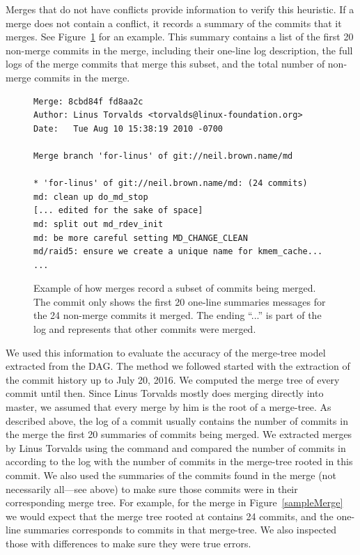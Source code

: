 \documentclass[conference, draftclsnofoot, draft]{IEEEtran}
\begin{document}
Merges that do not have conflicts provide information to verify this heuristic. If a
merge does not contain a conflict, it records a summary of the commits that it
merges. See Figure~\ref{fig:sampleMerge} for an example. This summary contains a
list of the first 20 non-merge commits in the merge, including their one-line log
description, the full logs of the merge commits that merge this subset, and the
total number of non-merge commits in the merge.

\begin{figure}[htbp]
        \centering
        {\fontsize{7}{9}
        \begin{verbatim}
Merge: 8cbd84f fd8aa2c
Author: Linus Torvalds <torvalds@linux-foundation.org>
Date:   Tue Aug 10 15:38:19 2010 -0700

Merge branch 'for-linus' of git://neil.brown.name/md

* 'for-linus' of git://neil.brown.name/md: (24 commits)
md: clean up do_md_stop
[... edited for the sake of space]
md: split out md_rdev_init
md: be more careful setting MD_CHANGE_CLEAN
md/raid5: ensure we create a unique name for kmem_cache...
...
        \end{verbatim}}\vspace{-5mm}
        \caption{Example of how merges record a subset of commits being merged. The
                commit only shows the first 20 one-line summaries messages for the 24
                non-merge commits it merged. The ending ``...'' is part of the log
                and represents that other commits were merged.}
        \label{fig:sampleMerge}
\end{figure}



We used this information to evaluate the accuracy of the merge-tree model extracted from the DAG. The method we followed
started with the extraction of the commit history up to July 20, 2016. We computed the merge tree of every commit until
then. Since Linus Torvalds mostly does merging directly into master, we assumed that every merge by him is the root of a
merge-tree. As described above, the log of a commit usually contains the number of commits in the merge the first 20
summaries of commits being merged. We extracted merges by Linus Torvalds using the command  and compared
the number of commits in according to the log with the number of commits in the  merge-tree rooted in this commit. We
also used the summaries of the commits found in the merge (not necessarily all---see above) to make sure those 
commits were in their corresponding merge tree. For example, for the merge in Figure~\ref{sampleMerge} we would expect
that the merge tree rooted at  contains 24 commits, and the one-line summaries corresponds to commits in
that merge-tree. We also inspected those with differences to make sure they were true errors.
\end{document}
